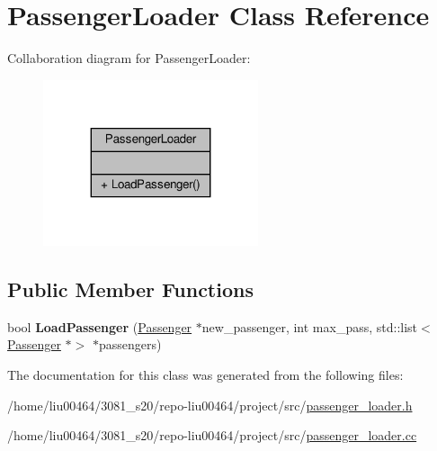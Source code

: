 \hypertarget{classPassengerLoader}{}\section{Passenger\+Loader Class Reference}
\label{classPassengerLoader}


Collaboration diagram for Passenger\+Loader\+:\nopagebreak
\begin{figure}[H]
\begin{center}
\leavevmode
\includegraphics[width=179pt]{classPassengerLoader__coll__graph}
\end{center}
\end{figure}
\subsection*{Public Member Functions}
\begin{DoxyCompactItemize}
\item 
\mbox{\label{classPassengerLoader_a00478bfb6b51a4a2ddef13972775f97a}} 
bool {\bfseries Load\+Passenger} (\hyperlink{classPassenger}{Passenger} $\ast$new\+\_\+passenger, int max\+\_\+pass, std\+::list$<$ \hyperlink{classPassenger}{Passenger} $\ast$$>$ $\ast$passengers)
\end{DoxyCompactItemize}


The documentation for this class was generated from the following files\+:\begin{DoxyCompactItemize}
\item 
/home/liu00464/3081\+\_\+s20/repo-\/liu00464/project/src/\hyperlink{passenger__loader_8h}{passenger\+\_\+loader.\+h}\item 
/home/liu00464/3081\+\_\+s20/repo-\/liu00464/project/src/\hyperlink{passenger__loader_8cc}{passenger\+\_\+loader.\+cc}\end{DoxyCompactItemize}
